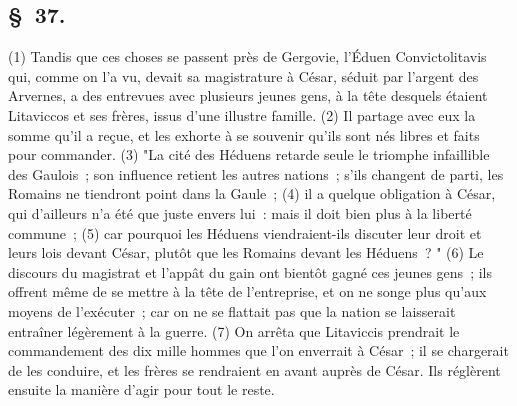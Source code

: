 \documentclass[french,twoside]{book} %
\begin{document}
\subsection[{§ 37.}]{ \textsc{§ 37.} }
\noindent (1) Tandis que ces choses se passent près de Gergovie, l’Éduen Convictolitavis qui, comme on l’a vu, devait sa magistrature à César, séduit par l’argent des Arvernes, a des entrevues avec plusieurs jeunes gens, à la tête desquels étaient Litaviccos et ses frères, issus d’une illustre famille. (2) Il partage avec eux la somme qu’il a reçue, et les exhorte à se souvenir qu’ils sont nés libres et faits pour commander. (3) "La cité des Héduens retarde seule le triomphe infaillible des Gaulois ; son influence retient les autres nations ; s’ils changent de parti, les Romains ne tiendront point dans la Gaule ; (4) il a quelque obligation à César, qui d’ailleurs n’a été que juste envers lui : mais il doit bien plus à la liberté commune ; (5) car pourquoi les Héduens viendraient-ils discuter leur droit et leurs lois devant César, plutôt que les Romains devant les Héduens ? " (6) Le discours du magistrat et l’appât du gain ont bientôt gagné ces jeunes gens ; ils offrent même de se mettre à la tête de l’entreprise, et on ne songe plus qu’aux moyens de l’exécuter ; car on ne se flattait pas que la nation se laisserait entraîner légèrement à la guerre. (7) On arrêta que Litaviccis prendrait le commandement des dix mille hommes que l’on enverrait à César ; il se chargerait de les conduire, et les frères se rendraient en avant auprès de César. Ils réglèrent ensuite la manière d’agir pour tout le reste.
\end{document}

